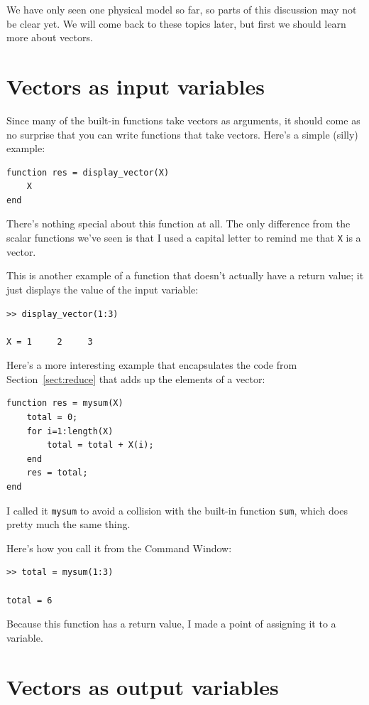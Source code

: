\documentclass[
]{book}
\begin{document}
We have only seen one physical model so far, so parts of this
discussion may not be clear yet.  We will come back to these topics
later, but first we should learn more about vectors.



\section{Vectors as input variables}

Since many of the built-in functions take vectors as arguments,
it should come as no surprise that you can write functions that
take vectors.  Here's a simple (silly) example:

\begin{verbatim}
function res = display_vector(X)
    X
end
\end{verbatim}

There's nothing special about this function at all.  The only
difference from the scalar functions we've seen is that I used
a capital letter to remind me that {\tt X} is a vector.

This is another example of a function that doesn't actually have
a return value; it just displays the value of the input variable:

\begin{verbatim}
>> display_vector(1:3)

X = 1     2     3
\end{verbatim}

Here's a more interesting example that encapsulates the code
from Section~\ref{sect:reduce} that adds up the elements of a vector:

\begin{verbatim}
function res = mysum(X)
    total = 0;
    for i=1:length(X)
        total = total + X(i);
    end
    res = total;
end
\end{verbatim}

I called it {\tt mysum} to avoid a collision with the built-in
function {\tt sum}, which does pretty much the same thing.

Here's how you call it from the Command Window:

\begin{verbatim}
>> total = mysum(1:3)

total = 6
\end{verbatim}

Because this function has a return value, I made a
point of assigning it to a variable.


\section{Vectors as output variables}
\end{document}
